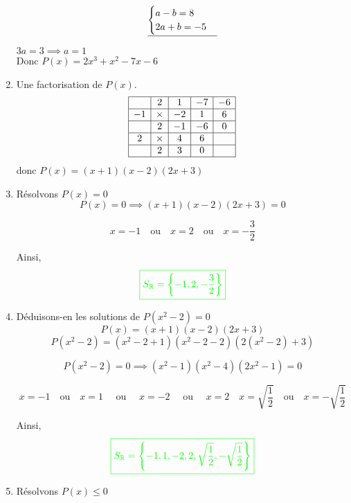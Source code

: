\documentclass[12pt,a4paper]{article}
\begin{document}
\begin{enumerate}
\[
\underline{
\begin{cases}
a - b  = 8 \\
2a + b = -5
\end{cases}
}\\
\]
\begin{center}
$3a=3 \implies a=1$\\
Donc \( P(x) = 2x^3 + x^2 - 7x - 6 \)
\end{center}
\item Une factorisation de \( P(x) \).
\[
\begin{array}{|c|c|c|c|c|}
\hline
 & 2 & 1 & -7 & -6  \\ 
\hline
-1 & \times & -2 & 1 & 6 \\ 
\hline
 & 2 & -1 & -6 & 0  \\
\hline
2 & \times & 4 & 6 &  \\ 
\hline
& 2 & 3 & 0 &   \\
\hline
\end{array}
\]
donc \( P(x) = (x+1)(x-2)(2x+3) \)

\item Résolvons \( P(x) = 0 \)
\[
P(x) = 0 \implies (x+1)(x-2)(2x+3) = 0
\]
  
\[
x = -1 \quad \text{ou} \quad x = 2 \quad \text{ou} \quad x = -\frac{3}{2}
\]

Ainsi,  
\[
\textcolor{green}{\boxed{S_{\mathbb{R}} = \left\{ -1, 2, -\frac{3}{2} \right\}}}
\]

\item Déduisons-en les solutions de \( P(x^2 - 2) = 0 \)
 \[ P(x) = (x+1)(x-2)(2x+3) \]
\[
P(x^2 - 2) = (x^2 - 2 + 1)(x^2 - 2 - 2)(2(x^2 - 2) + 3)
\]

\[
P(x^2 - 2) = 0 \implies (x^2 - 1)(x^2-4)(2x^2 - 1) = 0
\]
 
\[
x = -1 \quad \text{ou} \quad x = 1 \quad \text{ ou } \quad x=-2 \quad \text{ ou } \quad x=2\quad x = \sqrt{\frac{1}{2}} \quad \text{ou} \quad x = -\sqrt{\frac{1}{2}}
\]

Ainsi,  
\[
\textcolor{green}{\boxed{S_{\mathbb{R}} = \left\{ -1, 1, -2,2, \sqrt{\frac{1}{2}}, -\sqrt{\frac{1}{2}} \right\}}} 
\]

\item  Résolvons \( P(x) \leq 0 \)

\begin{center}
\end{center}
\end{enumerate}
\end{document}
